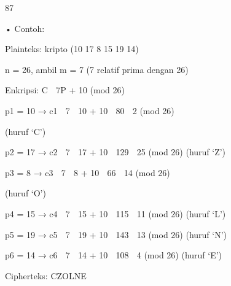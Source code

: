 \documentclass{article}
\begin{document}

87

• Contoh: 

 Plainteks: kripto (10 17  8  15  19  14) 

 n = 26, ambil m = 7   (7 relatif prima dengan 26)

 Enkripsi: C  7P + 10 (mod 26) 



p1 = 10  → c1  7  10 + 10  80  2 (mod 26) 

(huruf ‘C’)


p2 = 17  → c2  7  17 + 10  129  25 (mod 26) (huruf ‘Z’)


p3 = 8    → c3  7  8 + 10  66  14 (mod 26) 

(huruf ‘O’)


p4 = 15  → c4  7  15 + 10  115  11 (mod 26) (huruf ‘L’)


p5 = 19  → c5  7  19 + 10  143  13 (mod 26) (huruf ‘N’)


p6 = 14  → c6  7  14 + 10  108  4 (mod 26) (huruf ‘E’)

 Cipherteks: CZOLNE
\end{document}
